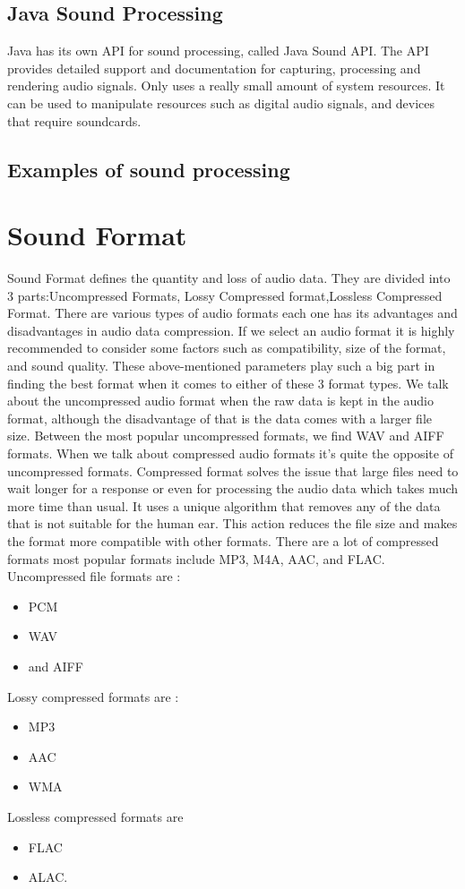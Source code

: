 \documentclass[english,12pt,oneside,a4paper]{article}
\begin{document}
\begin{center}
		\subsection{Java Sound Processing}
		Java has its own API for sound processing, called Java Sound API. The API provides detailed support and documentation for capturing, processing and rendering audio signals. Only uses a really small amount of system resources. It can be used to manipulate resources such as digital audio signals, and devices that require soundcards.
		\subsection{Examples of sound processing}
		
		\section{Sound Format}
		Sound Format defines the  quantity and loss of audio data.
		They are divided into 3 parts:Uncompressed Formats,	Lossy Compressed format,Lossless Compressed Format.
		There are various types of audio formats each one has its advantages and disadvantages in audio data compression. If we select an audio format it is highly recommended to consider some factors such as compatibility, size of the format, and sound quality. These above-mentioned parameters play such a big part in finding the best format when it comes to either of these 3 format types. We talk about the uncompressed audio format when the raw data is kept in the audio format, although the disadvantage of that is the data comes with a larger file size. Between the most popular uncompressed formats, we find WAV and AIFF formats. When we talk about compressed audio formats it's quite the opposite of uncompressed formats. Compressed format solves the issue that large files need to wait longer for a response or even for processing the audio data which takes much more time than usual. It uses a unique algorithm that removes any of the data that is not suitable for the human ear. This action reduces the file size and makes the format more compatible with other formats. There are a lot of compressed formats most popular formats include  MP3, M4A, AAC, and FLAC.
		\\
		Uncompressed file formats are :
		\begin{itemize}
		\item PCM
		\item WAV 
		\item and AIFF
		\end{itemize}
		Lossy compressed formats are : 
		\begin{itemize}
		\item MP3
		\item AAC
		\item WMA
		\end{itemize}
		Lossless compressed formats are
		\begin{itemize}
		\item FLAC
		\item ALAC.
		\end{itemize}
		

\end{center}
\end{document}
